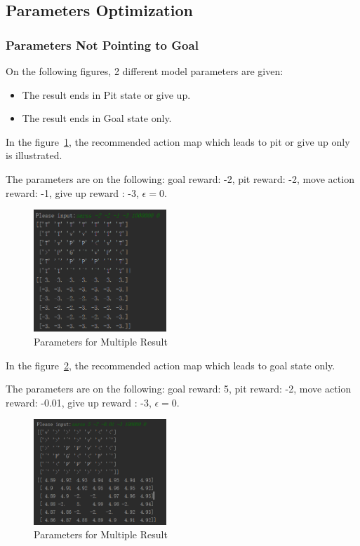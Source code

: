 \documentclass[11pt, a4paper]{article}
\begin{document}
\subsection{Parameters Optimization }

\subsubsection{Parameters Not Pointing to Goal}

On the following figures, 2 different model parameters are given: 

\begin{itemize}
\item The result ends in Pit state or give up. 
\item The result ends in Goal state only.
\end{itemize}

In the figure~\ref{fig:5_1}, the recommended action map which leads to pit or give up only is illustrated.

The parameters are on the following: goal reward: -2, pit reward: -2, move action reward: -1, give up reward : -3, $\epsilon = 0.$


\begin{figure}[htbp] 
	\begin{center}
		\includegraphics[width=5cm]{5_a_1} 
		\caption{Parameters for Multiple Result} 
		\label{fig:5_1}
	\end{center}
\end{figure}

In the figure~\ref{fig:5_2}, the recommended action map which leads to goal state only.

The parameters are on the following: goal reward: 5, pit reward: -2, move action reward: -0.01, give up reward : -3, $\epsilon = 0.$


\begin{figure}[htbp] 
	\begin{center}
		\includegraphics[width=5cm]{5_a_2} 
		\caption{Parameters for Multiple Result} 
		\label{fig:5_2}
	\end{center}
\end{figure}
\end{document}
